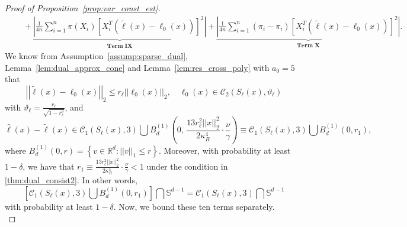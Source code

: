 \documentclass[ejsv2,noshowframe]{imsart}
\theoremstyle{plain}
\theoremstyle{definition}
\theoremstyle{remark}
\newcommand{\norm}[1]{\left|\left| #1 \right|\right|}
\renewcommand{\hat}{\widehat}
\renewcommand{\tilde}{\widetilde}
\begin{document}
\begin{proof}[Proof of Proposition~\ref{prop:var_const_est}]
\begin{align*}
		&\quad + \underbrace{\left|\frac{1}{4n}\sum_{i=1}^n \pi(X_i) \left[X_i^T\left(\tilde{\ell}(x)-\ell_0(x)\right)\right]^2\right|}_{\textbf{Term IX}} + \underbrace{\left|\frac{1}{4n}\sum_{i=1}^n \left(\hat{\pi}_i -\pi_i\right) \left[X_i^T\left(\tilde{\ell}(x)-\ell_0(x)\right)\right]^2\right|}_{\textbf{Term X}}.         
	\end{align*}
	We know from Assumption~\ref{assump:sparse_dual}, Lemma~\ref{lem:dual_approx_cone} and Lemma~\ref{lem:res_cross_poly} with $a_0=5$ that 
	\begin{equation}
		\label{geom_const1}
		\norm{\tilde{\ell}(x) -\ell_0(x)}_2 \leq r_{\ell} \norm{\ell_0(x)}_2, \quad \ell_0(x) \in \mathcal{C}_2\left(S_{\ell}(x),\vartheta_{\ell}\right)
	\end{equation}
	with $\vartheta_{\ell}=\frac{r_{\ell}}{\sqrt{1-r_{\ell}^2}}$, and 
	\begin{equation}
		\label{geom_const2}
		\hat{\ell}(x)-\tilde{\ell}(x) \in \mathcal{C}_1\left(S_{\ell}(x), 3 \right) \bigcup B_d^{(1)}\left(0,\, \frac{13 r_{\ell}^2 \norm{x}_2^2}{2 \kappa_R^4} \cdot \frac{\nu}{\gamma}\right) \equiv \mathcal{C}_1\left(S_{\ell}(x), 3 \right) \bigcup B_d^{(1)}(0,r_1),
	\end{equation}
	where $B_d^{(1)}(0,r) = \left\{v\in \mathbb{R}^d: \norm{v}_1 \leq r\right\}$. Moreover, with probability at least $1-\delta$, we have that $r_1\equiv \frac{13 r_{\ell}^2 \norm{x}_2^2}{2 \kappa_R^4} \cdot \frac{\nu}{\gamma} < 1$ under the condition in \autoref{thm:dual_consist2}. In other words, 
	$$\left[\mathcal{C}_1\left(S_{\ell}(x), 3 \right) \bigcup B_d^{(1)}(0,r_1)\right] \bigcap \mathbb{S}^{d-1} = \mathcal{C}_1\left(S_{\ell}(x), 3 \right) \bigcap \mathbb{S}^{d-1}$$
	with probability at least $1-\delta$. Now, we bound these ten terms separately.\\
	

\end{proof}
\end{document}
